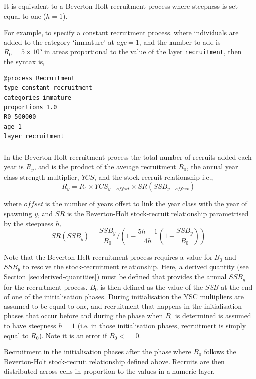 It is equivalent to a Beverton-Holt recruitment process where steepness is set equal to one ($h=1$).

For example, to specify a constant recruitment process, where individuals are added to the category `immature' at $age=1$, and the number to add is $R_0=5 \times 10^5$ in areas proportional to the value of the layer \texttt{recruitment}, then the syntax is,
{\small{\begin{verbatim}
@process Recruitment
type constant_recruitment
categories immature
proportions 1.0
R0 500000
age 1
layer recruitment
\end{verbatim}}}

\subsubsection*{}

In the Beverton-Holt recruitment process the total number of recruits added each year is $R_y$, and is the product of the average recruitment $R_0$, the annual year class strength multiplier, $YCS$, and the stock-recruit relationship i.e.,
\begin{equation}
  R_y = R_0 \times YCS_{y-offset} \times SR(SSB_{y-offset})
\end{equation}
  
where $offset$ is the number of years offset to link the year class with the year of spawning $y$, and $SR$ is the Beverton-Holt stock-recruit relationship parametrised by the steepness $h$,
\begin{equation}
SR(SSB_y) = \frac{SSB_y}{B_0} / \left( 1-\frac{5h-1}{4h} \left( 1-\frac{SSB_y}{B_0} \right) \right)
\end{equation}

Note that the Beverton-Holt recruitment process requires a value for $B_0$ and $SSB_y$ to resolve the stock-recruitment relationship. Here, a derived quantity (see Section \ref{sec:derived-quantities}) must be defined that provides the annual $SSB_y$ for the recruitment process. $B_0$ is then defined as the value of the $SSB$ at the end of one of the initialisation phases. During initialisation the YSC multipliers are assumed to be equal to one, and recruitment that happens in the initialisation phases that occur before and during the phase when $B_0$ is determined is assumed to have steepness $h=1$ (i.e. in those initialisation phases, recruitment is simply equal to $R_0$). Note it is an error if $B_0 <= 0$. 

Recruitment in the initialisation phases after the phase where $B_0$ follows the Beverton-Holt stock-recruit relationship defined above. Recruits are then distributed across cells in proportion to the values in a numeric layer. 

